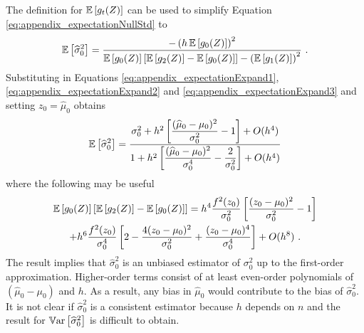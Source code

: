 The definition for $\operatorname{\mathbb{E}}\left[g_t(Z)\right]$ can be used to simplify Equation \eqref{eq:appendix_expectationNullStd} to
\begin{equation}
  \operatorname{\mathbb{E}}\left[\widehat{\sigma}_0^{2}\right]
  =
  \dfrac{
    -\left(h\operatorname{\mathbb{E}}\left[g_0(Z)\right]\right)^2
  }
  {
    \operatorname{\mathbb{E}}\left[g_0(Z)\right]\left[
      \operatorname{\mathbb{E}}\left[g_2(Z)\right] - \operatorname{\mathbb{E}}\left[g_0(Z)\right]
    \right]
    - \left(\operatorname{\mathbb{E}}\left[g_1(Z)\right]\right)^2
  }
  \ .
\end{equation}
Substituting in Equations \eqref{eq:appendix_expectationExpand1}, \eqref{eq:appendix_expectationExpand2} and \eqref{eq:appendix_expectationExpand3}  and setting $z_0 = \widehat{\mu}_0$ obtains
\begin{equation}
\operatorname{\mathbb{E}}\left[\widehat{\sigma}_0^{2}\right]
=
\dfrac{
  \sigma_0^2+h^2\left[\dfrac{(\widehat{\mu}_0-\mu_0)^2}{\sigma_0^2}-1\right]
  +O(h^4)
}
{
  1 + h^2\left[\dfrac{(\widehat{\mu}_0-\mu_0)^2}{\sigma_0^4}-\dfrac{2}{\sigma_0^2}\right]
  +O(h^4)
}
\end{equation}
where the following may be useful
\begin{multline}
\operatorname{\mathbb{E}}\left[g_0(Z)\right]\left[
    \operatorname{\mathbb{E}}\left[g_2(Z)\right] - \operatorname{\mathbb{E}}\left[g_0(Z)\right]
  \right]
=
h^4\dfrac{f^2(z_0)}{\sigma_0^2}\left[
  \dfrac{(z_0-\mu_0)^2}{\sigma_0^2}-1
\right]
\\
+h^6\dfrac{f^2(z_0)}{\sigma_0^4}\left[
  2 - \dfrac{4(z_0-\mu_0)^2}{\sigma_0^2} + \dfrac{(z_0-\mu_0)^4}{\sigma_0^4}
\right]
+O(h^8)
\ .
\end{multline}
The result implies that $\widehat{\sigma}_0^{2}$ is an unbiased estimator of $\sigma_0^{2}$ up to the first-order approximation. Higher-order terms consist of at least even-order polynomials of $(\widehat{\mu}_0-\mu_0)$ and $h$. As a result, any bias in $\widehat{\mu}_0$ would contribute to the bias of $\widehat{\sigma}_0^{2}$. It is not clear if $\widehat{\sigma}_0^{2}$ is a consistent estimator because $h$ depends on $n$ and the result for $\operatorname{\mathbb{V}ar}\left[\widehat{\sigma}_0^{2}\right]$ is difficult to obtain.
